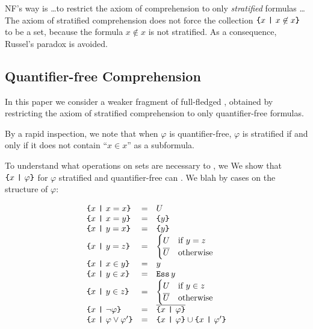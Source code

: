 \documentclass[sigplan,10pt,anonymous,review]{acmart}%
\begin{document}
NF's way is \dots to restrict the axiom of comprehension to only \emph{stratified} formulas \ldots
The axiom of stratified comprehension does not force the collection $\text{\texttt{\{}} x ~\text{\texttt{|}}~ x \not\in x \text{\texttt{\}}}$ to be a set, because the formula $x \not\in x$ is not stratified. As a consequence, Russel's paradox is avoided.

\subsection{Quantifier-free Comprehension}

In this paper we consider a weaker fragment of full-fledged \NF{}, obtained by restricting the axiom of stratified comprehension to only quantifier-free formulas.



By a rapid inspection, we note that when $\varphi$ is quantifier-free, $\varphi$ is stratified if and only if it does not contain ``$x \in x$'' as a subformula.

To understand what operations on sets are necessary to , we 
We show that $\text{\texttt{\{}} x ~\text{\texttt{|}}~ \varphi \text{\texttt{\}}}$ for $\varphi$ stratified and quantifier-free can . We blah by cases on the structure of $\varphi$:

\[\begin{array}{lcll}
  \text{\texttt{\{}} x ~\text{\texttt{|}}~ x = x \text{\texttt{\}}} & = & U \\
  \text{\texttt{\{}} x ~\text{\texttt{|}}~ x = y \text{\texttt{\}}} & = & \text{\texttt{\{}} y \text{\texttt{\}}} \\
  \text{\texttt{\{}} x ~\text{\texttt{|}}~ y = x \text{\texttt{\}}} & = & \text{\texttt{\{}} y \text{\texttt{\}}} \\
  \text{\texttt{\{}} x ~\text{\texttt{|}}~ y = z \text{\texttt{\}}} & = &
    \begin{cases}
      U & \text{if } y = z\\
      \overline{U} & \text{otherwise}
    \end{cases}\\
  \text{\texttt{\{}} x ~\text{\texttt{|}}~ x \in y \text{\texttt{\}}} & = & y \\
  \text{\texttt{\{}} x ~\text{\texttt{|}}~ y \in x \text{\texttt{\}}} & = & \text{\texttt{Ess}}\,y \\
  \text{\texttt{\{}} x ~\text{\texttt{|}}~ y \in z \text{\texttt{\}}} & = &
    \begin{cases}
      U & \text{if } y \in z\\
      \overline{U} & \text{otherwise}
    \end{cases}\\
  \text{\texttt{\{}} x ~\text{\texttt{|}}~ \neg\varphi \text{\texttt{\}}} & = & \overline{\text{\texttt{\{}} x ~\text{\texttt{|}}~ \varphi \text{\texttt{\}}}} \\
  \text{\texttt{\{}} x ~\text{\texttt{|}}~ \varphi \lor \varphi' \text{\texttt{\}}} & = & \text{\texttt{\{}} x ~\text{\texttt{|}}~ \varphi \text{\texttt{\}}} \cup \text{\texttt{\{}} x ~\text{\texttt{|}}~ \varphi' \text{\texttt{\}}} \\
\end{array}\]
\end{document}
